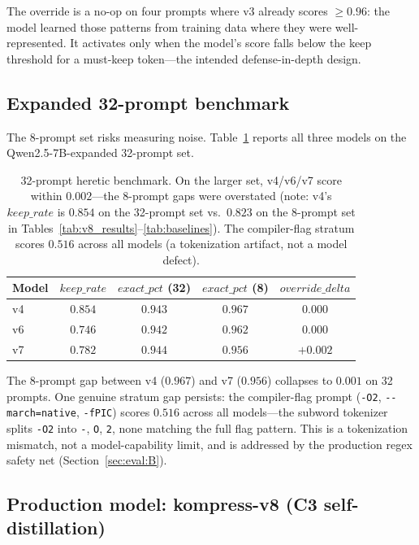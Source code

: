 The override is a no-op on four prompts where v3 already scores $\ge 0.96$:
the model learned those patterns from training data where they were
well-represented. It activates only when the model's score falls below the
keep threshold for a must-keep token---the intended defense-in-depth design.

\subsection{Expanded 32-prompt benchmark}
\label{sec:eval:expanded}

The 8-prompt set risks measuring noise. Table~\ref{tab:32prompt} reports all
three models on the Qwen2.5-7B-expanded 32-prompt set.

\begin{table}[h]
\centering
\caption{32-prompt heretic benchmark. On the larger set, v4/v6/v7 score
within $0.002$---the 8-prompt gaps were overstated (note: v4's
$\mathit{keep\_rate}$ is $0.854$ on the 32-prompt set vs.\ $0.823$ on the
8-prompt set in Tables~\ref{tab:v8_results}--\ref{tab:baselines}). The
compiler-flag stratum scores $0.516$ across all models (a tokenization
artifact, not a model defect).}
\label{tab:32prompt}
\begin{tabular}{lcccc}
\toprule
Model & $\mathit{keep\_rate}$ & $\mathit{exact\_pct}$ (32) & $\mathit{exact\_pct}$ (8) & $\mathit{override\_delta}$ \\
\midrule
v4 & $0.854$ & $0.943$ & $0.967$ & $0.000$ \\
v6 & $0.746$ & $0.942$ & $0.962$ & $0.000$ \\
v7 & $0.782$ & $0.944$ & $0.956$ & $+0.002$ \\
\bottomrule
\end{tabular}
\end{table}

The 8-prompt gap between v4 ($0.967$) and v7 ($0.956$) collapses to $0.001$
on 32 prompts. One genuine stratum gap persists: the compiler-flag prompt
(\texttt{-O2}, \texttt{-{}-march=native}, \texttt{-fPIC}) scores $0.516$
across all models---the subword tokenizer splits \texttt{-O2} into
\texttt{-}, \texttt{O}, \texttt{2}, none matching the full flag pattern. This
is a tokenization mismatch, not a model-capability limit, and is addressed by
the production regex safety net (Section~\ref{sec:eval:B}).

\subsection{Production model: kompress-v8 (C3 self-distillation)}
\label{sec:eval:v8}

